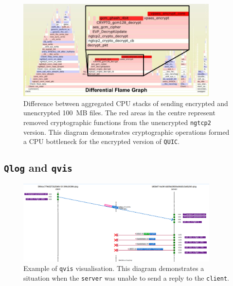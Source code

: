 \documentclass[12pt,a4paper]{report}
\newcommand\note[2]{{\color{#1}\bf #2}}
\newcommand\simon[1]{\ifcomments{\note{cyan}{SM: #1}}\fi}
\begin{document}
    \begin{figure}[htbp]
    \centering
    \includegraphics[width=0.9\textwidth]{figs/perf-kernel__johns_BIG_letter__encrypted_minus_perf-kernel__johns_BIG_letter__unencrypted.png}
    \caption[Difference between aggregated CPU stacks of sending encrypted and unencrypted 100MB files]{Difference between aggregated CPU stacks of sending encrypted and unencrypted 100~MB files. The red areas in the centre represent removed cryptographic functions from the unencrypted \texttt{ngtcp2} version. This diagram demonstrates cryptographic operations formed a CPU bottleneck for the encrypted version of \texttt{QUIC}.}
    \label{fig:perf-kernel__johns_BIG_letter__encrypted_minus_perf-kernel__johns_BIG_letter__unencrypted}
    \end{figure}






    
\subsection{\texttt{Qlog} and \texttt{qvis}}

    \begin{figure}[htbp]
    \centering
    \includegraphics[width=0.9\textwidth]{figs/qvis.png}
    \caption[Example of \texttt{qvis} visualisation]{Example of \texttt{qvis} visualisation. This diagram demonstrates a situation when the \texttt{server} was unable to send a reply to the \texttt{client}.}
    \label{fig:qvis}
    \end{figure}
\end{document}
